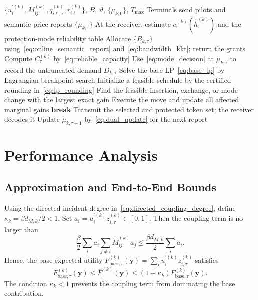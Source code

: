 \documentclass[journal]{IEEEtran}
\begin{document}
\begin{algorithm}[t]
\caption{Reliability-Aware Token and Bandwidth Scheduling}
\label{alg:schedule}
\begin{algorithmic}[1]
\REQUIRE $\{u_i^{\prime(k)},M_{ij}^{(k)},q_{i\ell,\tau}^{(k)},r_{i\ell}^{(k)}\}$, $B$, $\vartheta$, $\{\mu_{k,0}\}$, $T_{\max}$
\STATE Terminals send pilots and semantic-price reports $\{\mu_{k,\tau}\}$
\STATE At the receiver, estimate $c_{\varepsilon}^{(k)}(\widehat h_{\tau}^{(k)})$ and the protection-mode reliability table
\STATE Allocate $\{B_{k,\tau}\}$ using~\eqref{eq:online_semantic_report} and~\eqref{eq:bandwidth_kkt}; return the grants
\STATE Compute $C_{\tau}^{(k)}$ by~\eqref{eq:reliable_capacity}
\STATE Use~\eqref{eq:mode_decision} at $\mu_{k,\tau}$ to record the untruncated demand $D_{k,\tau}$
\STATE Solve the base LP~\eqref{eq:base_lp} by Lagrangian breakpoint search
\STATE Initialize a feasible schedule by the certified rounding in~\eqref{eq:lp_rounding}
\STATE Find the feasible insertion, exchange, or mode change with the largest exact gain
\STATE Execute the move and update all affected marginal gains
\ELSE
\STATE \textbf{break}
\ENDIF
\ENDFOR
\STATE Transmit the selected and protected token set; the receiver decodes it
\STATE Update $\mu_{k,\tau+1}$ by~\eqref{eq:dual_update} for the next report
\ENDFOR
\ENDFOR
\end{algorithmic}
\end{algorithm}

\section{Performance Analysis}
\label{sec:analysis}

\subsection{Approximation and End-to-End Bounds}

Using the directed incident degree in~\eqref{eq:directed_coupling_degree}, define $\kappa_k=\beta d_{M,k}/2<1$. Set $a_i=u_i^{\prime(k)}z_{i,\tau}^{(k)}\in[0,1]$. Then the coupling term is no larger than
\begin{equation}
\frac{\beta}{2}\sum_i a_i
\sum_{j\neq i}\overleftrightarrow M_{ij}^{(k)}a_j
\leq\frac{\beta d_{M,k}}{2}\sum_i a_i.
\label{eq:coupling_degree_bound}
\end{equation}
Hence, the base expected utility
$F_{\mathrm{base},\tau}^{(k)}(\bm y)=\sum_i u_i^{\prime(k)}z_{i,\tau}^{(k)}$ satisfies
\begin{equation}
F_{\mathrm{base},\tau}^{(k)}(\bm y)
\leq\overline F_{\tau}^{(k)}(\bm y)
\leq(1+\kappa_k)F_{\mathrm{base},\tau}^{(k)}(\bm y).
\label{eq:utility_sandwich}
\end{equation}
The condition $\kappa_k<1$ prevents the coupling term from dominating the base contribution.
\end{document}
